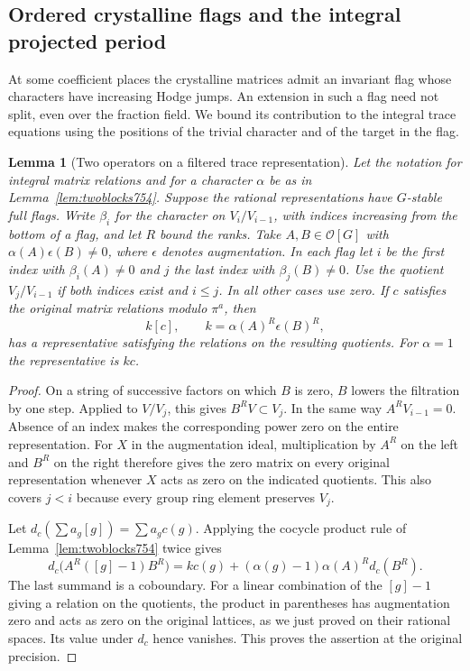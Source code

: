 \documentclass[a4paper,11pt]{article}
\newtheorem{lemma}[proposition]{Lemma}
\theoremstyle{definition}
\theoremstyle{remark}
\numberwithin{equation}{section}
\begin{document}
\subsection{Ordered crystalline flags and the integral projected period}
\label{sec:orderedflags756}
At some coefficient places the crystalline matrices admit an invariant
flag whose characters have increasing Hodge jumps. An extension in
such a flag need not split, even over the fraction field. We bound
its contribution to the integral trace equations using the positions
of the trivial character and of the target in the flag.

\begin{lemma}[Two operators on a filtered trace representation]
\leavevmode\label{lem:flagoperators756}
Let the notation for integral matrix relations and for a character
\(\alpha\) be as in Lemma~\ref{lem:twoblocks754}. Suppose the rational
representations have \(G\)-stable full flags. Write \(\beta_i\) for the
character on \(V_i/V_{i-1}\), with indices increasing from the bottom
of a flag, and let \(R\) bound the ranks. Take \(A,B\in\mathcal O[G]\)
with \(\alpha(A)\epsilon(B)\ne0\), where \(\epsilon\) denotes
augmentation. In each flag let \(i\) be the first index with
\(\beta_i(A)\ne0\) and \(j\) the last index with \(\beta_j(B)\ne0\).
Use the quotient \(V_j/V_{i-1}\) if both indices exist and \(i\le j\).
In all other cases use zero. If \(c\) satisfies the original matrix
relations modulo \(\pi^a\), then
\[
                     k[c],\qquad k=\alpha(A)^R\epsilon(B)^R,
\]
has a representative satisfying the relations on the resulting
quotients. For \(\alpha=1\) the representative is \(kc\).
\end{lemma}
\begin{proof}
On a string of successive factors on which \(B\) is zero, \(B\)
lowers the filtration by one step. Applied to \(V/V_j\), this gives
\(B^RV\subset V_j\). In the same way \(A^RV_{i-1}=0\). Absence
of an index makes the corresponding power zero on the entire
representation. For \(X\) in the augmentation ideal, multiplication
by \(A^R\) on the left and \(B^R\) on the right therefore gives
the zero matrix on every original representation whenever \(X\)
acts as zero on the indicated quotients. This also covers \(j<i\)
because every group ring element preserves \(V_j\).

Let \(d_c(\sum a_g[g])=\sum a_gc(g)\). Applying the cocycle product
rule of Lemma~\ref{lem:twoblocks754} twice gives
\[
 d_c\big(A^R([g]-1)B^R\big)
  =k c(g)+(\alpha(g)-1)\alpha(A)^R d_c(B^R).
\]
The last summand is a coboundary. For a linear combination of the
\([g]-1\) giving a relation on the quotients, the product in
parentheses has augmentation zero and acts as zero on the original
lattices, as we just proved on their rational spaces. Its value
under \(d_c\) hence vanishes. This proves the assertion at the
original precision.
\end{proof}
\end{document}
